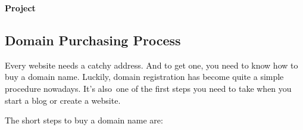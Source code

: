 \documentclass[12pt]{report}
\renewcommand{\_}{\kern-1.5pt\textunderscore\kern-1.5pt}
\begin{document}
\begin{adjustwidth}{-0.1in}{0.84in}
\begin{FlushRight}
{\fontsize{24pt}{28.8pt}\selectfont \textbf{\textcolor[HTML]{0D0D0D}{Project}}\par}
\end{FlushRight}\par

\end{adjustwidth}


\vspace{\baselineskip}

\vspace{\baselineskip}
\vspace{\baselineskip}

\vspace{\baselineskip}
\subsection{Domain Purchasing Process}
\begin{adjustwidth}{1.18in}{0.55in}
 \tabto{0.59in} \textcolor[HTML]{0D0D0D}{Every website needs a catchy address. And to get one, you need to know how to buy a domain name. Luckily, domain registration has become quite a simple procedure nowadays. It’s also\ one of the first steps you need to take when you  start a blog or create a website.}\par

\end{adjustwidth}


\vspace{\baselineskip}\begin{adjustwidth}{1.18in}{0.0in}
 \tabto{0.59in} \textcolor[HTML]{0D0D0D}{The short steps to buy a domain name are:}\par

\end{adjustwidth}
\end{document}
